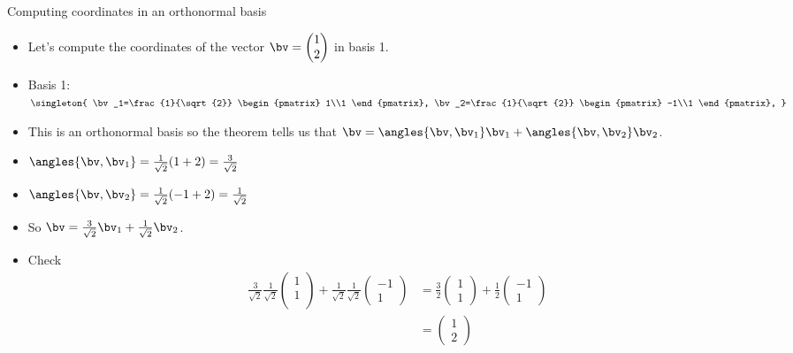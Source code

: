 \documentclass{beamer}
\begin{document}
\begin{frame}{Computing coordinates in an orthonormal basis}
\begin{itemize}
\item Let's compute the coordinates of the vector $\bv=\begin{pmatrix} 1\\2 \end{pmatrix}$ in basis 1.
\item Basis 1: $\singleton{
\bv_1=\frac{1}{\sqrt{2}}
\begin{pmatrix} 1\\1 \end{pmatrix},
\bv_2=\frac{1}{\sqrt{2}}
\begin{pmatrix} -1\\1 \end{pmatrix},
}$
\item This is an orthonormal basis so the theorem tells us that $\bv=\angles{\bv,\bv_1}\bv_1+\angles{\bv,\bv_2}\bv_2$.
\item $\angles{\bv,\bv_1} = \frac{1}{\sqrt{2}}(1 + 2) = \frac{3}{\sqrt{2}}$
\item $\angles{\bv,\bv_2} = \frac{1}{\sqrt{2}}(-1 + 2) = \frac{1}{\sqrt{2}}$
\item So $\bv=\frac{3}{\sqrt{2}}\bv_1 + \frac{1}{\sqrt{2}}\bv_2$.
\item Check
\begin{align*}
\frac{3}{\sqrt{2}}\frac{1}{\sqrt{2}}
\begin{pmatrix}1\\1\\\end{pmatrix} +  \frac{1}{\sqrt{2}}\frac{1}{\sqrt{2}}\begin{pmatrix}-1\\1\end{pmatrix}
&=\frac{3}{2}\begin{pmatrix}1\\1\end{pmatrix}+\frac{1}{2}\begin{pmatrix}-1\\1\end{pmatrix} \\
&=\begin{pmatrix}1\\2\end{pmatrix}
\end{align*}
\end{itemize}
\end{frame}
\end{document}
